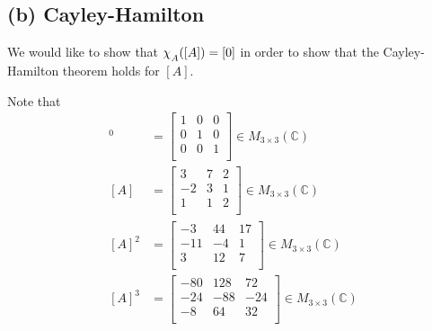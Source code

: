 \documentclass[12pt, letterpaper]{article}
\newcommand{\C}{\mathbb{C}}
\begin{document}
\subsection*{(b) \textmd{Cayley-Hamilton}}

We would like to show that $\chi_{\raisebox{-.5ex}{$\scriptstyle A$}}([A]) = [0]$ in order to show that the Cayley-Hamilton theorem holds for $[A]$.

Note that
\begin{align*}
[A]^0 &= \begin{bmatrix}
1 & 0 & 0 \\
0 & 1 & 0 \\
0 & 0 & 1 \\
\end{bmatrix} \in M_{3\times3}(\C) \\
[A] &= \begin{bmatrix}
3 & 7 & 2 \\
-2 & 3 & 1 \\
1 & 1 & 2 \\
\end{bmatrix} \in M_{3\times3}(\C) \\
[A]^2 &= \begin{bmatrix}
-3 & 44 & 17 \\
-11 & -4 & 1 \\
3 & 12 & 7 \\
\end{bmatrix} \in M_{3\times3}(\C) \\
[A]^3 &= \begin{bmatrix}
-80 & 128 & 72 \\
-24 & -88 & -24 \\
-8 & 64 & 32 \\
\end{bmatrix} \in M_{3\times3}(\C)
\end{align*}
\end{document}
